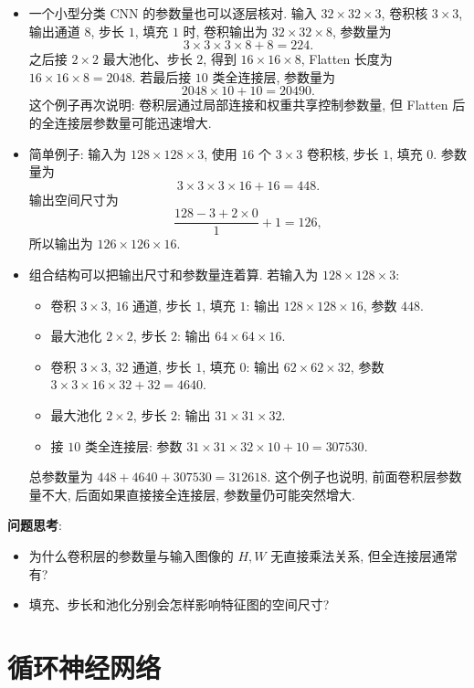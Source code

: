 \documentclass{../nndlcourse}
\begin{document}
\begin{enumerate}
\begin{itemize}
        \item 一个小型分类 CNN 的参数量也可以逐层核对. 输入 $32\times32\times3$, 卷积核 $3\times3$, 输出通道 $8$, 步长 $1$, 填充 $1$ 时, 卷积输出为 $32\times32\times8$, 参数量为
        \[
            3\times3\times3\times8+8=224.
        \]
        之后接 $2\times2$ 最大池化、步长 $2$, 得到 $16\times16\times8$, Flatten 长度为 $16\times16\times8=2048$. 若最后接 $10$ 类全连接层, 参数量为
        \[
            2048\times10+10=20490.
        \]
        这个例子再次说明: 卷积层通过局部连接和权重共享控制参数量, 但 Flatten 后的全连接层参数量可能迅速增大.
        \item 简单例子: 输入为 $128\times128\times3$, 使用 $16$ 个 $3\times3$ 卷积核, 步长 $1$, 填充 $0$. 参数量为
        \[
            3\times3\times3\times16+16=448.
        \]
        输出空间尺寸为
        \[
            \frac{128-3+2\times0}{1}+1=126,
        \]
        所以输出为 $126\times126\times16$.
        \item 组合结构可以把输出尺寸和参数量连着算. 若输入为 $128\times128\times3$:
        \begin{itemize}
            \item 卷积 $3\times3$, $16$ 通道, 步长 $1$, 填充 $1$: 输出 $128\times128\times16$, 参数 $448$.
            \item 最大池化 $2\times2$, 步长 $2$: 输出 $64\times64\times16$.
            \item 卷积 $3\times3$, $32$ 通道, 步长 $1$, 填充 $0$: 输出 $62\times62\times32$, 参数 $3\times3\times16\times32+32=4640$.
            \item 最大池化 $2\times2$, 步长 $2$: 输出 $31\times31\times32$.
            \item 接 $10$ 类全连接层: 参数 $31\times31\times32\times10+10=307530$.
        \end{itemize}
        总参数量为 $448+4640+307530=312618$. 这个例子也说明, 前面卷积层参数量不大, 后面如果直接接全连接层, 参数量仍可能突然增大.
    \end{itemize}
\end{enumerate}

\textbf{问题思考}:
\begin{itemize}
    \item 为什么卷积层的参数量与输入图像的 $H,W$ 无直接乘法关系, 但全连接层通常有?
    \item 填充、步长和池化分别会怎样影响特征图的空间尺寸?
\end{itemize}

\section{循环神经网络}
\end{document}
